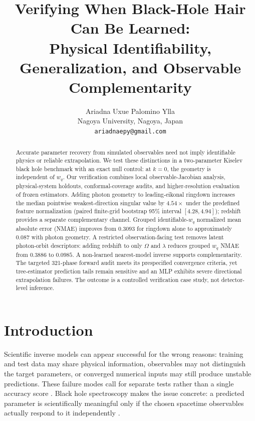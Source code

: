 \documentclass{article}
\title{Verifying When Black-Hole Hair Can Be Learned:\\Physical Identifiability, Generalization, and Observable Complementarity}
\author{Ariadna Uxue Palomino Ylla\\Nagoya University, Nagoya, Japan\\\texttt{ariadnaepy@gmail.com}}
\begin{document}
\maketitle
\begin{abstract}
Accurate parameter recovery from simulated observables need not imply identifiable physics or reliable extrapolation. We test these distinctions in a two-parameter Kiselev black hole benchmark with an exact null control: at $k=0$, the geometry is independent of $w_q$. Our verification combines local observable-Jacobian analysis, physical-system holdouts, conformal-coverage audits, and higher-resolution evaluation of frozen estimators. Adding photon geometry to leading-eikonal ringdown increases the median pointwise weakest-direction singular value by $4.54\times$ under the predefined feature normalization (paired finite-grid bootstrap 95\% interval $[4.28,4.94]$); redshift provides a separate complementary channel. Grouped identifiable-$w_q$ normalized mean absolute error (NMAE) improves from $0.3093$ for ringdown alone to approximately $0.087$ with photon geometry. A restricted observation-facing test removes latent photon-orbit descriptors: adding redshift to only $\Omega$ and $\lambda$ reduces grouped $w_q$ NMAE from $0.3886$ to $0.0985$. A non-learned nearest-model inverse supports complementarity. The targeted 321-phase forward audit meets its prespecified convergence criteria, yet tree-estimator prediction tails remain sensitive and an MLP exhibits severe directional extrapolation failures. The outcome is a controlled verification case study, not detector-level inference.
\end{abstract}
\section{Introduction}
Scientific inverse models can appear successful for the wrong reasons: training and test data may share physical information, observables may not distinguish the target parameters, or converged numerical inputs may still produce unstable predictions. These failure modes call for separate tests rather than a single accuracy score \citep{cranmer2020,ovadia2019}. Black hole spectroscopy makes the issue concrete: a predicted parameter is scientifically meaningful only if the chosen spacetime observables actually respond to it independently \citep{dreyer2004,cardoso2009}.
\end{document}
